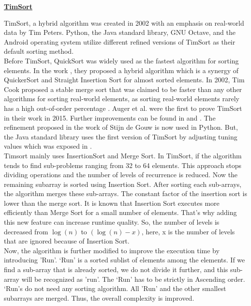 \documentclass[article,10pt]{article}
\begin{document}
\begin{multicols}{2}


\begin{center} \underline{\textbf{TimSort}} \end{center}
TimSort, a hybrid algorithm was created in 2002 with an emphasis on real-world data by Tim Peters\cite{peters2015TimSort}. Python, the Java standard library, GNU Octave, and the Android operating system utilize different refined versions of TimSort as their default sorting method.\\
Before TimSort, QuickSort was widely used as the fastest algorithm for sorting elements. In the work \cite{Cook-et-al:1980}, they proposed a hybrid algorithm which is a synergy of QuickerSort\cite{quicker} and Straight Insertion Sort\cite{Knuth-StInsertion} for almost sorted elements\cite{Cook-et-al:1980}. In 2002, Tim Cook proposed a stable merge sort that was claimed to be faster than any other algorithms for sorting real-world elements, as sorting real-world elements rarely has a high out-of-order percentage \cite{peters2015TimSort}.  Auger et al.\cite{Auger-2015} were the first to prove TimSort in their work in 2015. Further improvements can be found in \cite{Auger-2019}  and \cite{gouw-java}.
The refinement proposed in the work of Stijn de Gouw\cite{gouw-java} is now used in Python. But, the Java standard library uses the first version of TimSort by adjusting tuning values which was exposed in \cite{gouw-java}. 
\\
Timsort mainly uses InsertionSort and Merge Sort. In TimSort, if the algorithm tends to find sub-problems ranging from 32 to 64 elements\cite{peters2015TimSort}. This approach stops dividing operations and the number of levels of recurrence is reduced. Now the remaining subarray is sorted using Insertion Sort. After sorting each sub-arrays, the algorithm merges these sub-arrays. The constant factor of the insertion sort is lower than the merge sort. It is known that Insertion Sort executes more efficiently than Merge Sort for a small number of elements\cite{Cook-et-al:1980}. That’s why adding this new feature can increase runtime quality. So, the number of levels is decreased from $\log(n)$ to $(\log(n)-x)$, here, x is the number of levels that are ignored because of Insertion Sort.
\\
Now, the algorithm is further modified to improve the execution time by introducing 'Run'. ‘Run’ is a sorted sublist of elements among the elements\cite{Knuth-Merge}. If we find a sub-array that is already sorted, we do not divide it further, and this sub-array will be recognized as 'run'. The ‘Run’ has to be strictly in Ascending order\cite{peters2015TimSort}. ‘Run’s do not need any sorting algorithm. All 'Run' and the other smallest subarrays are merged. Thus, the overall complexity is improved.


\end{multicols}
\end{document}
